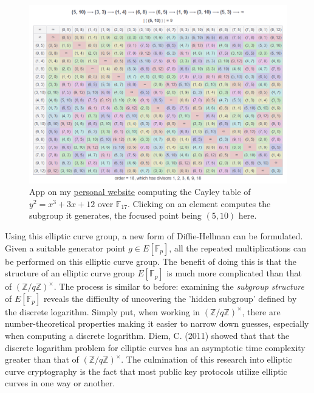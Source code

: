 \documentclass[11pt, a4paper]{report}
\newcommand{\integers}{\mathbb{Z}}
\newcommand{\field}{\mathbb{F}}
\begin{document}
\begin{figure}[ht]
\begin{center}
\includegraphics[width=\linewidth]{cayleytable.png} 
\caption{App on my \href{jacobbruner.com/elliptic-curve}{personal website} computing the Cayley table of $y^2 = x^3 + 3x + 12$ over $\field_{17}$. Clicking on an element computes the subgroup it generates, the focused point being $(5,10)$ here.}
\label{fig:cayley}
\end{center}
\end{figure}

Using this elliptic curve group, a new form of Diffie-Hellman can be formulated. Given a suitable generator point $g \in E[\field_p]$, all the repeated multiplications can be performed on this elliptic curve group. The benefit of doing this is that the structure of an elliptic curve group $E[\field_p]$ is much more complicated than that of $(\integers / q \integers)^{\times}$. The process is similar to before: examining the \textit{subgroup structure} of $E[\field_p]$ reveals the difficulty of uncovering the 'hidden subgroup' defined by the discrete logarithm. Simply put, when working in $(\integers / q \integers)^{\times}$, there are number-theoretical properties making it easier to narrow down guesses, especially when computing a discrete logarithm. Diem, C. (2011) showed that that the discrete logarithm problem for elliptic curves has an asymptotic time complexity greater than that of $(\integers / q \integers)^{\times}$.\autocite[76]{diem} The culmination of this research into elliptic curve cryptography is the fact that most public key protocols utilize elliptic curves in one way or another. 
\end{document}
